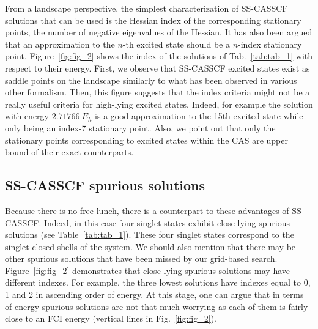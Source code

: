 \documentclass[aps,prb,reprint,showkeys,superscriptaddress]{revtex4-1}
\begin{document}
From a landscape perspective, the simplest characterization of SS-CASSCF solutions that can be used is the Hessian index of the corresponding stationary points, \ie the number of negative eigenvalues of the Hessian.
It has also been argued that an approximation to the $n$-th excited state should be a $n$-index stationary point. \cite{Olsen_1983,Olsen_1982}
Figure~\ref{fig:fig_2} shows the index of the solutions of Tab.~\ref{tab:tab_1} with respect to their energy.
First, we observe that SS-CASSCF excited states exist as saddle points on the landscape similarly to what has been observed in various other formalism. \cite{Gilbert_2008,Hait_2021,Kossoski_2021}
Then, this figure suggests that the index criteria might not be a really useful criteria for high-lying excited states.
Indeed, for example the solution with energy $2.71766~E_h$ is a good approximation to the 15th excited state while only being an index-7 stationary point.
Also, we point out that only the stationary points corresponding to excited states within the CAS are upper bound of their exact counterparts. \cite{Helgaker_2000,Mahler_2021}

\subsection{SS-CASSCF spurious solutions}
\label{sec:spurious}

Because there is no free lunch, there is a counterpart to these advantages of SS-CASSCF.
Indeed, in this case four singlet states exhibit close-lying spurious solutions (see Table~\ref{tab:tab_1}).
These four singlet states correspond to the singlet closed-shells of the system.
We should also mention that there may be other spurious solutions that have been missed by our grid-based search.
Figure~\ref{fig:fig_2} demonstrates that close-lying spurious solutions may have different indexes.
For example, the three lowest solutions have indexes equal to 0, 1 and 2 in ascending order of energy.
At this stage, one can argue that in terms of energy spurious solutions are not that much worrying as each of them is fairly close to an FCI energy (vertical lines in  Fig.~\ref{fig:fig_2}).
\end{document}
